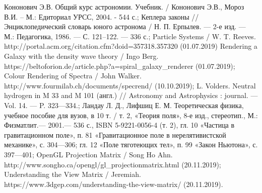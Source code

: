 
\nocite{*}

\begin{thebibliography}{}
     Кононович Э.В. Общий курс астрономии. Учебник. / Кононович Э.В.,
    Мороз В.И. – М.: Едиториал УРСС, 2004. - 544 с.;
     Кеплера законы // Энциклопедический словарь юного астронома / Н. П. Ерпылев. — 2-е изд. — М.: Педагогика, 1986. — С. 121–122. — 336 с.;
	 Particle Systems /  W. T. Reeves. http://portal.acm.org/citation.cfm?doid=357318.357320 (01.07.2019)
     Rendering a Galaxy with the density wave theory / Ingo Berg. https://beltoforion.de/article.php?a=spiral\_galaxy\_renderer (01.07.2019);
	 Colour Rendering of Spectra / John Walker. http://www.fourmilab.ch/documents/specrend/ (10.10.2019);
	 L. Volders. Neutral hydrogen in M 33 and M 101 (англ.) // Astronomy and Astrophysics : journal. — Vol. 14. — P. 323—334.;
	 Ландау Л. Д., Лифшиц Е. М. Теоретическая физика, учебное пособие для вузов, в 10 т. / т. 2, «Теория поля», 8-е изд., стереотип., М.: Физматлит.— 2001.— 536 с., ISBN 5-9221-0056-4 (т. 2), гл. 10 «Частица в гравитационном поле», п. 81 «Гравитационное поле в нерелятивистской механике», с. 304—306; гл. 12 «Поле тяготеющих тел», п. 99 «Закон Ньютона», с. 397—401;
	 OpenGL Projection Matrix / Song Ho Ahn. http://www.songho.ca/opengl/gl\_projectionmatrix.html (20.11.2019);
	 Understanding the View Matrix / Jeremiah. https://www.3dgep.com/understanding-the-view-matrix/ (20.11.2019).
\end{thebibliography}

